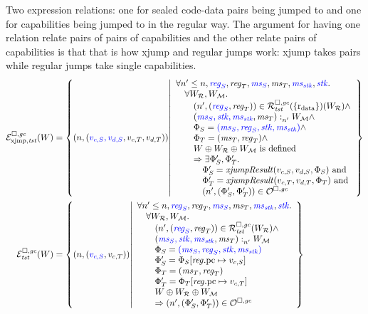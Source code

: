 \documentclass[a4paper]{article}
\begin{document}
Two expression relations: one for sealed code-data pairs being jumped to and one for capabilities being jumped to in the regular way.
The argument for having one relation relate pairs of pairs of capabilities and the other relate pairs of capabilities is that that is how xjump and regular jumps work: xjump takes pairs while regular jumps take single capabilities.
\begin{align*}
  \lrexjg{\trust}(W) &= \left\{ \npair{\stpair[.]{v_{c,S},v_{d,S}}{v_{c,T},v_{d,T}}} \middle| 
    \begin{array}{l}
      \forall n' \leq n, \src{\reg_S}, \reg_T, \src{\ms_S}, \ms_T, \src{\ms_\stk}, \src{\stk} \ldotp\\
      \quad \forall W_\lrrs , W_\lrm \ldotp \\
      \qquad\npair[n']{\stpair{\reg}{\reg}} \in \lrrg{\trust}(\{\rdata\}) (W_\lrrs ) \wedge\\
      \qquad\memSat[n']{\stpair[.]{\ms_S,\stk,\ms_\stk}{\ms_T}}{W_\lrm} \wedge \\
      \qquad\Phi_S = \src{(\ms_S,\reg_S,\stk, \ms_\stk)}\wedge\\
      \qquad\Phi_T = (\ms_T,\reg_T) \wedge\\
      \qquad W \oplus W_\lrrs \oplus W_\lrm \text{ is defined }\\
      \qquad\Rightarrow \exists \Phi_S',\Phi_T'\ldotp\\
      \quad\qquad \Phi_S' = \xjumpResult{v_{c,S}}{v_{d,S}}{\Phi_S} \tand\\
      \quad\qquad\Phi_T' = \xjumpResult{v_{c,T}}{v_{d,T}}{\Phi_T}\tand\\
      \quad\qquad\npair[n']{\left(\Phi_S', \Phi_T' \right)}\in \lro
    \end{array}
    \right\}\\
  \lreg{\trust}(W) &= \left\{ \npair{\stpair[.]{v_{c,S}}{v_{c,T}}} \middle| 
    \begin{array}{l}
      \forall n' \leq n, \src{\reg_S}, \reg_T, \src{\ms_S}, \ms_T, \src{\ms_\stk}, \src{\stk} \ldotp\\
      \quad \forall W_\lrrs , W_\lrm \ldotp \\
      \qquad\npair[n']{\stpair{\reg}{\reg}} \in \lrrg{\trust} (W_\lrrs ) \wedge\\
      \qquad\memSat[n']{\stpair[.]{\ms_S,\stk,\ms_\stk}{\ms_T}}{W_\lrm} \\
      \qquad\Phi_S = \src{(\ms_S,\reg_S,\stk, \ms_\stk)}\\
      \qquad \Phi_S' = \Phi_S \updReg{\pcreg}{v_{c,S}}\\
      \qquad\Phi_T = (\ms_T,\reg_T)\\
      \qquad\Phi_T' = \Phi_T\updReg{\pcreg}{v_{c,T}}\\
      \qquad W \oplus W_\lrrs \oplus W_\lrm\\
      \qquad\Rightarrow\npair[n']{\left(\Phi_S', \Phi_T' \right)}\in \lro
    \end{array}
    \right\}
\end{align*}
 
\end{document}
